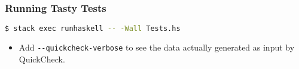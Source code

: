 \begin{frame}[fragile]

\frametitle{Running Tasty Tests}



\vspace{\fill}

\pause

\begin{lstlisting}[language=bash]
$ stack exec runhaskell -- -Wall Tests.hs
\end{lstlisting}

\begin{itemize}

\item Add \lstinline[language=bash]|--quickcheck-verbose| to see the data
actually generated as input by QuickCheck.

\end{itemize}

\end{frame}
